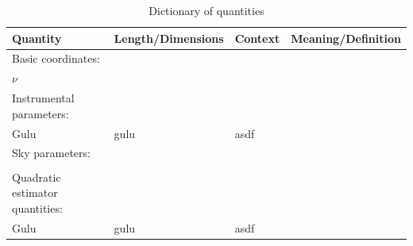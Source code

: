 \documentclass[twocolumn,aps,prd,nofootinbib,showpacs]{revtex4-1}
\begin{document}
\begin{table}
\caption{\label{tab:Definitions}Dictionary of quantities}
\begin{ruledtabular}
\begin{tabular}{llll}
Quantity & Length/Dimensions  & Context & Meaning/Definition\\
\hline
Basic coordinates: &&&\\
$\nu$ & & & \\
\hline
Instrumental parameters: &  & &\\
Gulu & gulu & asdf &\\
\hline
Sky parameters: &&& \\
&&& \\
\hline
Quadratic estimator quantities: &  & &\\
Gulu & gulu & asdf &
\end{tabular}
\end{ruledtabular}
\end{table}
\end{document}

